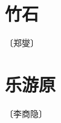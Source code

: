 \documentclass[12pt,UTF-8,openany]{ctexbook}
\begin{document}
\vspace{8pt}


\section{竹石}

\begin{center}
    \vspace{10pt}
    
    \begin{normalsize}
        
        〔郑燮〕
        
    \end{normalsize}
    
    \vspace{8pt}
    
    \begin{large}
        
        
        
    \end{large}
    
\end{center}

\vspace{8pt}


\section{乐游原}

\begin{center}
    \vspace{10pt}
    
    \begin{normalsize}
        
        〔李商隐〕
        
    \end{normalsize}
    
    \vspace{8pt}
    
    \begin{large}
        
        
        
    \end{large}
    
\end{center}
\end{document}
